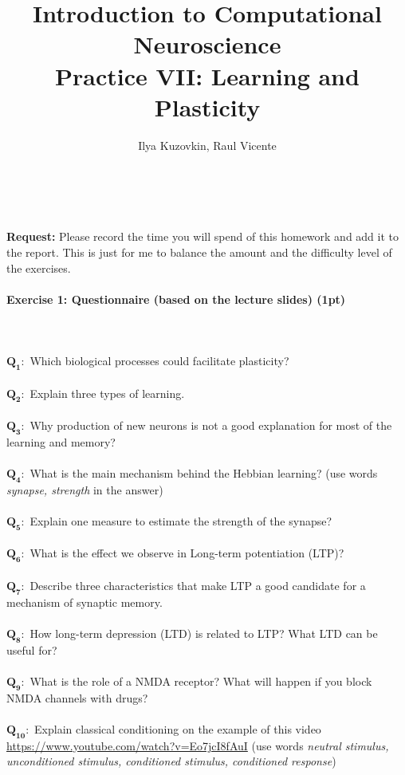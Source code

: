 \documentclass[a4paper,11pt]{article}
\author{\large{Ilya Kuzovkin, Raul Vicente}}
\title{\huge{Introduction to Computational Neuroscience}\\\LARGE{Practice VII: Learning and Plasticity}}
\newenvironment{exercise}[3]{\paragraph{Exercise #1: #2 (#3pt)}\ \\}{
\medskip}
\newcommand{\question}[2]{\setlength\parindent{0mm}\ \\$\mathbf{Q_{#1}:}$ #2\ \\}
\begin{document}
\maketitle


%
%
\ \\

\ \\
\textbf{Request:} Please record the time you will spend of this homework and add it to the report. This is just for me to balance the amount and the difficulty level of the exercises.

%
% 
%
\begin{exercise}{1}{Questionnaire (based on the lecture slides)}{1}
\question{1}{Which biological processes could facilitate plasticity?}
\question{2}{Explain three types of learning.}
\question{3}{Why production of new neurons is not a good explanation for most of the learning and memory?}
\question{4}{What is the main mechanism behind the Hebbian learning? (use words \emph{synapse, strength} in the answer)}
\question{5}{Explain one measure to estimate the strength of the synapse?}
\question{6}{What is the effect we observe in Long-term potentiation (LTP)?}
\question{7}{Describe three characteristics that make LTP a good candidate for a mechanism of synaptic memory.}
\question{8}{How long-term depression (LTD) is related to LTP? What LTD can be useful for?}
\question{9}{What is the role of a NMDA receptor? What will happen if you block NMDA channels with drugs?}
\question{10}{Explain classical conditioning on the example of this video \url{https://www.youtube.com/watch?v=Eo7jcI8fAuI} (use words \emph{neutral stimulus, unconditioned stimulus, conditioned stimulus, conditioned response})}
\end{exercise}
\end{document}
